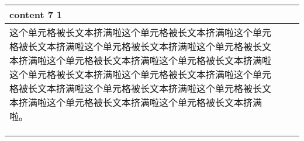 \begin{longtable}{ X | X | X |}
    \cline{1-1}
    
        content 7 1 &
        &
        \\
        
    \hline
    
        这个单元格被长文本挤满啦这个单元格被长文本挤满啦这个单元格被长文本挤满啦这个单元格被长文本挤满啦这个单元格被长文本挤满啦这个单元格被长文本挤满啦这个单元格被长文本挤满啦这个单元格被长文本挤满啦这个单元格被长文本挤满啦这个单元格被长文本挤满啦这个单元格被长文本挤满啦这个单元格被长文本挤满啦这个单元格被长文本挤满啦这个单元格被长文本挤满啦。 &
        &
        \\
        
    \hline
    
        &
        &
        \\
        
    \hline
    
        &
        &
        \\
        
    \hline
    
        &
        &
        \\
        
    \hline
    
\end{longtable}
